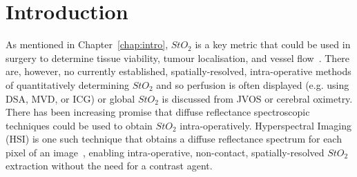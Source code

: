 
% 
\section{Introduction}\label{sec:intro}
As mentioned in Chapter~\ref{chap:intro}, $StO_2$ 
is a key metric that could be used in surgery to determine tissue viability, tumour localisation, and vessel flow~\citep{Takami2017, Hughes2019, Richardson2023}.
There are, however, no currently established, spatially-resolved, intra-operative methods of quantitatively determining $StO_2$ and so perfusion is often displayed (e.g. using DSA, MVD, or ICG) or global $StO_2$ is discussed from JVOS or cerebral oximetry.
There has been increasing promise that diffuse reflectance spectroscopic techniques could be used to obtain $StO_2$ intra-operatively. Hyperspectral Imaging (HSI) is one such technique that obtains a diffuse reflectance spectrum for each pixel of an image~\citep{Kulcke2018, Taylor-Williams2022}, enabling intra-operative, non-contact, spatially-resolved $StO_2$ extraction without the need for a contrast agent. 

